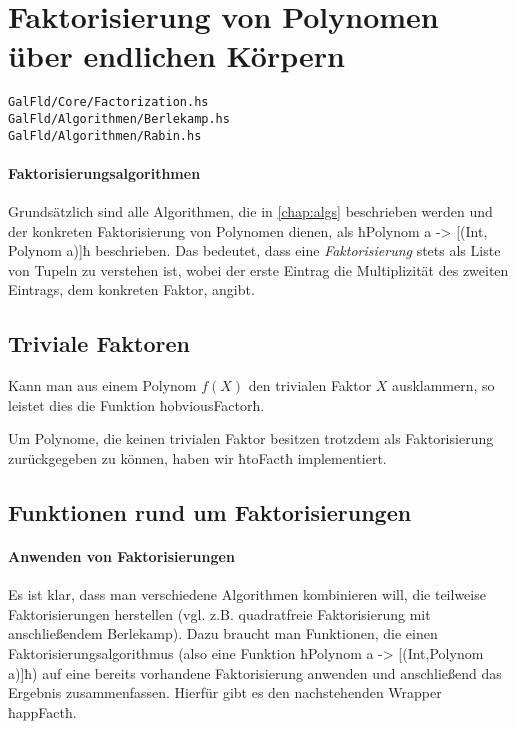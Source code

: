 \section{Faktorisierung von Polynomen über endlichen Körpern}
\texttt{GalFld/Core/Factorization.hs}\\
\texttt{GalFld/Algorithmen/Berlekamp.hs}\\
\texttt{GalFld/Algorithmen/Rabin.hs}


\paragraph{Faktorisierungsalgorithmen} Grundsätzlich sind alle Algorithmen, die
in \autoref{chap:algs} beschrieben werden und der konkreten Faktorisierung von
Polynomen dienen, als ħPolynom a -> [(Int, Polynom a)]ħ beschrieben. Das
bedeutet, dass eine \emph{Faktorisierung} stets als Liste von Tupeln zu
verstehen ist, wobei der erste Eintrag die Multiplizität des zweiten Eintrags,
dem konkreten Faktor, angibt.


\subsection{Triviale Faktoren} Kann man aus einem Polynom $f(X)$ 
den trivialen Faktor $X$ ausklammern, so leistet dies die Funktion
ħobviousFactorħ.


Um Polynome, die keinen trivialen Faktor besitzen trotzdem als Faktorisierung
zurückgegeben zu können, haben wir ħtoFactħ implementiert.



\subsection{Funktionen rund um Faktorisierungen}

\paragraph{Anwenden von Faktorisierungen} 
Es ist klar, dass man verschiedene Algorithmen kombinieren will, die teilweise
Faktorisierungen herstellen (vgl. z.B. quadratfreie Faktorisierung mit
anschließendem Berlekamp). Dazu braucht man Funktionen, die einen
Faktorisierungsalgorithmus (also eine Funktion 
ħPolynom a -> [(Int,Polynom a)]ħ) auf eine bereits vorhandene 
Faktorisierung anwenden und anschließend das
Ergebnis zusammenfassen. Hierfür gibt es den nachstehenden Wrapper ħappFactħ.

